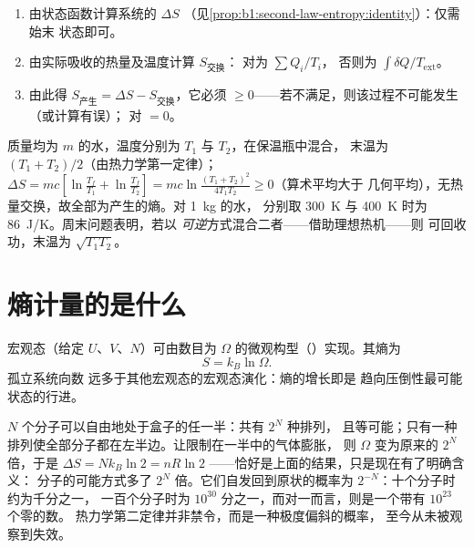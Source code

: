 \begin{method}[列写熵平衡]\label{met:b1:second-law-entropy:method}
\begin{enumerate}
  \item 由状态函数计算系统的 $\Delta S$
        （见\cref{prop:b1:second-law-entropy:identity}）：仅需始末
        状态即可。
  \item 由实际吸收的热量及温度计算 $S_{\text{交换}}$：
        对为 $\sum Q_i/T_i$，
        否则为 $\int\delta Q/T_{\mathrm{ext}}$。
  \item 由此得 $S_{\text{产生}} = \Delta S - S_{\text{交换}}$，它必须
        $\geq 0$——若不满足，则该过程不可能发生（或计算有误）；
        对 $= 0$。
\end{enumerate}
\end{method}

\begin{example}[冷热混合]\label{ex:b1:second-law-entropy:mixing}
质量均为 $m$ 的水，温度分别为 $T_1$ 与 $T_2$，在保温瓶中混合，
末温为 $(T_1 + T_2)/2$（由热力学第一定律）；$\Delta S = mc[\ln\frac{T_f}{T_1} + \ln\frac{T_f}{T_2}]
= mc\ln\frac{(T_1 + T_2)^2}{4T_1T_2} \geq 0$（算术平均大于
几何平均），无热量交换，故全部为产生的熵。对 \qty{1}{kg} 的水，
分别取 \qty{300}{K} 与 \qty{400}{K} 时为 \qty{86}{J/K}。周末问题表明，若以
\emph{可逆}方式混合二者——借助理想热机——则
可回收功，末温为 $\sqrt{T_1T_2}$。
\end{example}

\section{熵计量的是什么}

\begin{proposition}[玻尔兹曼公式]\label{prop:b1:second-law-entropy:boltzmann}
宏观态（给定 $U$、$V$、$N$）可由数目为
$\Omega$ 的微观构型（\emph{}）实现。其熵为
\[
S = k_B\ln\Omega .
\]
孤立系统向数
远多于其他宏观态的宏观态演化：熵的增长即是
趋向压倒性最可能状态的行进。
\end{proposition}
\admitted

\begin{example}[为什么气体不会自动回去]\label{ex:b1:second-law-entropy:count}
$N$ 个分子可以自由地处于盒子的任一半：共有 $2^N$ 种排列，
且等可能；只有一种排列使全部分子都在左半边。让限制在一半中的气体膨胀，
则 $\Omega$ 变为原来的 $2^N$ 倍，于是 $\Delta S =
Nk_B\ln2 = nR\ln2$ ——恰好是上面的结果，只是现在有了明确含义：
分子的可能方式多了 $2^N$ 倍。它们自发回到原状的概率为
$2^{-N}$：十个分子时约为千分之一，
一百个分子时为 $10^{30}$ 分之一，而对一而言，则是一个带有 $10^{23}$ 个零的数。
热力学第二定律并非禁令，而是一种极度偏斜的概率，
至今从未被观察到失效。
\end{example}

